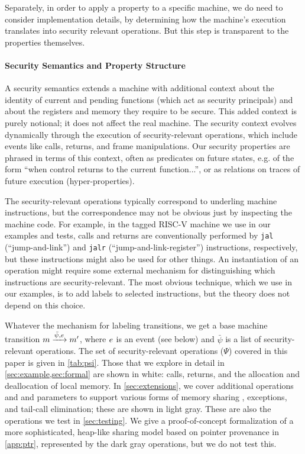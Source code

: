 \documentclass[10pt,conference]{ieeetran}%
\theoremstyle{definition}
\begin{document}
Separately, in order to apply a property to a specific machine, we do need to consider
implementation details, by determining how the machine's execution translates into
security relevant operations. But this step is transparent to the properties themselves.


\paragraph*{Security Semantics and Property Structure}

A security semantics extends a machine
with additional context about the identity of current and pending
functions (which act as security principals) and about the registers and memory they require
to be secure. This added context is purely notional;
it does not affect the real machine. The security context
evolves dynamically through the execution of security-relevant operations,
which include events like calls, returns, and frame manipulations.
Our security properties are phrased in terms of this context, often as predicates
on future states, e.g. of the form ``when control returns to the current function...'',
or as relations on traces of future execution (hyper-properties).

The security-relevant operations typically correspond to underling machine instructions,
but the correspondence may not be obvious just by inspecting the machine code.
For example, in the tagged RISC-V machine we use in our examples and tests,
calls and returns are conventionally performed by {\tt jal} (``jump-and-link'')
and {\tt jalr} (``jump-and-link-register'') instructions, respectively, but these
instructions might also be used for other things. An instantiation of an operation
might require some external mechanism for distinguishing which instructions are
security-relevant. The most obvious technique, which we use in our examples, is to add labels to
selected instructions, but the theory does not depend on this choice.

Whatever the mechanism for labeling transitions, we get a base
machine transition \(m \xrightarrow{\bar{\psi}, e} m'\), where \(e\) is
an event (see below) and \(\bar{\psi}\) is a list of security-relevant operations.
The set of security-relevant operations (\(\Psi\)) covered in this paper is given in
\cref{tab:psi}. Those that we explore in detail in \cref{sec:example,sec:formal}
are shown in white: calls, returns, and the allocation and deallocation of local memory.
In \cref{sec:extensions}, we cover additional operations and and parameters 
to support various forms of memory sharing \ifexceptions , exceptions, \fi
and tail-call elimination; these are shown in light gray. These are also
the operations we test in \cref{sec:testing}.
We give a proof-of-concept formalization of a more sophisticated, heap-like sharing model
based on pointer provenance in \cref{app:ptr}, represented by the dark gray
operations, but we do not test this.
\end{document}
